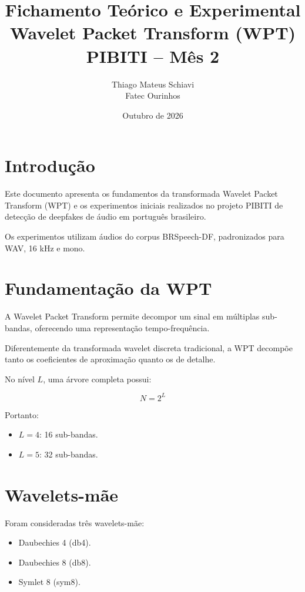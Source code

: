 \documentclass[12pt,a4paper]{article}
\title{
Fichamento Teórico e Experimental\\
\large Wavelet Packet Transform (WPT)\\
PIBITI -- Mês 2
}
\author{Thiago Mateus Schiavi\\
Fatec Ourinhos}
\date{Outubro de 2026}
\begin{document}
\maketitle
\tableofcontents
\newpage

\section{Introdução}

Este documento apresenta os fundamentos da transformada
Wavelet Packet Transform (WPT) e os experimentos iniciais
realizados no projeto PIBITI de detecção de deepfakes
de áudio em português brasileiro.

Os experimentos utilizam áudios do corpus BRSpeech-DF,
padronizados para WAV, 16 kHz e mono.

\section{Fundamentação da WPT}

A Wavelet Packet Transform permite decompor um sinal
em múltiplas sub-bandas, oferecendo uma representação
tempo-frequência.

Diferentemente da transformada wavelet discreta
tradicional, a WPT decompõe tanto os coeficientes
de aproximação quanto os de detalhe.

No nível $L$, uma árvore completa possui:

\begin{equation}
N = 2^L
\end{equation}

Portanto:

\begin{itemize}
\item $L=4$: 16 sub-bandas.
\item $L=5$: 32 sub-bandas.
\end{itemize}

\section{Wavelets-mãe}

Foram consideradas três wavelets-mãe:

\begin{itemize}
\item Daubechies 4 (db4).
\item Daubechies 8 (db8).
\item Symlet 8 (sym8).
\end{itemize}
\end{document}
